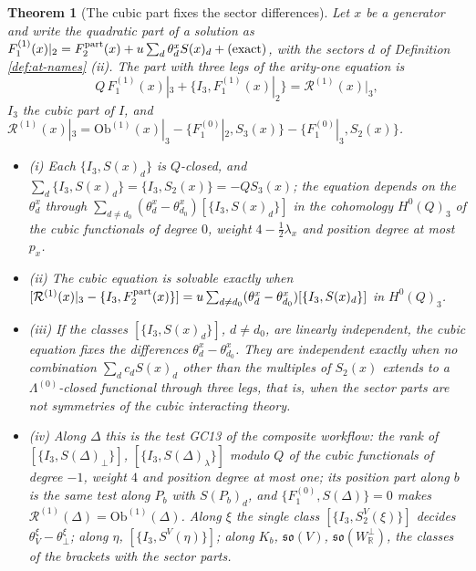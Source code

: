 \documentclass[11pt]{article}
\numberwithin{equation}{section}
\theoremstyle{plain}
\newtheorem{theorem}{Theorem}[section]
\theoremstyle{definition}
\newcommand{\Ob}{\mathrm{Ob}}
\begin{document}
\begin{theorem}[The cubic part fixes the sector differences]
\label{thm:at-cubic}
Let $x$ be a generator and write the quadratic part of a solution as $F_1^{(1)}(x)|_2=F^{\rm part}_2(x)+u\sum_d\theta^x_dS(x)_d+(\text{exact})$, with the sectors $d$ of Definition \ref{def:at-names} (ii). The part with three legs of the arity-one equation is
\[
Q\,F_1^{(1)}(x)|_3+\{I_3,F_1^{(1)}(x)|_2\}=\mathcal R^{(1)}(x)|_3,
\]
$I_3$ the cubic part of $I$, and $\mathcal R^{(1)}(x)|_3=\Ob^{(1)}(x)|_3-\{F_1^{(0)}|_2,S_3(x)\}-\{F_1^{(0)}|_3,S_2(x)\}$.
\begin{itemize}
\item (i) Each $\{I_3,S(x)_d\}$ is $Q$-closed, and $\sum_d\{I_3,S(x)_d\}=\{I_3,S_2(x)\}=-QS_3(x)$; the equation depends on the $\theta^x_d$ through $\sum_{d\ne d_0}(\theta^x_d-\theta^x_{d_0})[\{I_3,S(x)_d\}]$ in the cohomology $H^0(Q)_3$ of the cubic functionals of degree $0$, weight $4-\tfrac12\lambda_x$ and position degree at most $p_x$.
\item (ii) The cubic equation is solvable exactly when $[\mathcal R^{(1)}(x)|_3-\{I_3,F^{\rm part}_2(x)\}]=u\sum_{d\ne d_0}(\theta^x_d-\theta^x_{d_0})[\{I_3,S(x)_d\}]$ in $H^0(Q)_3$.
\item (iii) If the classes $[\{I_3,S(x)_d\}]$, $d\ne d_0$, are linearly independent, the cubic equation fixes the differences $\theta^x_d-\theta^x_{d_0}$. They are independent exactly when no combination $\sum_dc_dS(x)_d$ other than the multiples of $S_2(x)$ extends to a $\Lambda^{(0)}$-closed functional through three legs, that is, when the sector parts are not symmetries of the cubic interacting theory.
\item (iv) Along $\Delta$ this is the test GC13 of the composite workflow: the rank of $[\{I_3,S(\Delta)_\perp\}]$, $[\{I_3,S(\Delta)_\lambda\}]$ modulo $Q$ of the cubic functionals of degree $-1$, weight $4$ and position degree at most one; its position part along $b$ is the same test along $P_b$ with $S(P_b)_d$, and $\{F_1^{(0)},S(\Delta)\}=0$ makes $\mathcal R^{(1)}(\Delta)=\Ob^{(1)}(\Delta)$. Along $\xi$ the single class $[\{I_3,S^V_2(\xi)\}]$ decides $\theta^\xi_V-\theta^\xi_\perp$; along $\eta$, $[\{I_3,S^V(\eta)\}]$; along $K_b$, $\mathfrak{so}(V)$, $\mathfrak{so}(W^\perp_{\mathbb R})$, the classes of the brackets with the sector parts.
\end{itemize}
\end{theorem}
\end{document}
